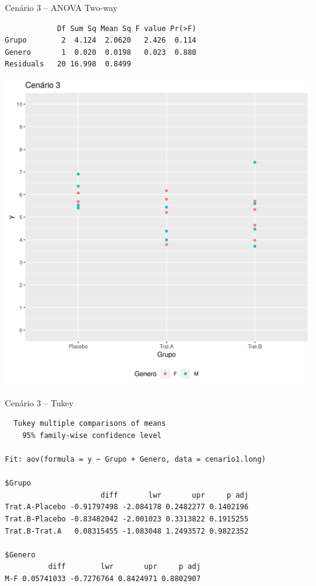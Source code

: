 \documentclass{beamer}
\begin{document}
\begin{frame}[fragile]{\scriptsize }
  \begin{exampleblock}{Cenário 3 -- ANOVA Two-way}
    \tiny
\begin{verbatim}
            Df Sum Sq Mean Sq F value Pr(>F)
Grupo        2  4.124  2.0620   2.426  0.114
Genero       1  0.020  0.0198   0.023  0.880
Residuals   20 16.998  0.8499
\end{verbatim}
    \begin{center}
      \includegraphics[height=.5\textheight]{Cap13-30/cenario12}
    \end{center}
  \end{exampleblock}
\end{frame}

\begin{frame}[fragile]{\scriptsize }
  \begin{exampleblock}{Cenário 3 -- Tukey}
    \tiny
\begin{verbatim}
  Tukey multiple comparisons of means
    95% family-wise confidence level

Fit: aov(formula = y ~ Grupo + Genero, data = cenario1.long)

$Grupo
                      diff       lwr       upr     p adj
Trat.A-Placebo -0.91797498 -2.084178 0.2482277 0.1402196
Trat.B-Placebo -0.83482042 -2.001023 0.3313822 0.1915255
Trat.B-Trat.A   0.08315455 -1.083048 1.2493572 0.9822352

$Genero
          diff        lwr       upr     p adj
M-F 0.05741033 -0.7276764 0.8424971 0.8802907
\end{verbatim}
  \end{exampleblock}
\end{frame}
\end{document}

